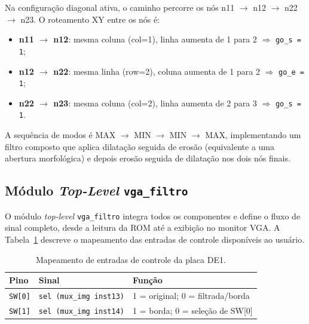 \documentclass[12pt, a4paper]{article}
\begin{document}
	Na configuração diagonal ativa, o caminho percorre os nós n11
	$\to$ n12 $\to$ n22 $\to$ n23. O roteamento XY entre os nós é:
	
	\begin{itemize}
		\item \textbf{n11 $\to$ n12}: mesma coluna (col=1), linha aumenta de 1
		para 2 $\Rightarrow$ \texttt{go\_s = 1};
		\item \textbf{n12 $\to$ n22}: mesma linha (row=2), coluna aumenta de 1
		para 2 $\Rightarrow$ \texttt{go\_e = 1};
		\item \textbf{n22 $\to$ n23}: mesma coluna (col=2), linha aumenta de 2
		para 3 $\Rightarrow$ \texttt{go\_s = 1}.
	\end{itemize}
	
	A sequência de modos é MAX $\to$ MIN $\to$ MIN $\to$ MAX, implementando um
	filtro composto que aplica dilatação seguida de erosão (equivalente a uma
	abertura morfológica) e depois erosão seguida de dilatação nos dois nós finais.
	
	\subsection{Módulo \textit{Top-Level} \texttt{vga\_filtro}}
	
	O módulo \textit{top-level} \texttt{vga\_filtro} integra todos os componentes
	e define o fluxo de sinal completo, desde a leitura da ROM até a exibição
	no monitor VGA. A Tabela~\ref{tab:controles} descreve o mapeamento das
	entradas de controle disponíveis ao usuário.
	
	\begin{table}[H]
		\centering
		\caption{Mapeamento de entradas de controle da placa DE1.}
		\label{tab:controles}
		\begin{tabular}{lll}
			\toprule
			\textbf{Pino} & \textbf{Sinal} & \textbf{Função} \\
			\midrule
			\texttt{SW[0]} & \texttt{sel (mux\_img inst13)} & 1 = original; 0 = filtrada/borda \\
			\texttt{SW[1]} & \texttt{sel (mux\_img inst14)} & 1 = borda; 0 = seleção de SW[0]  \\
			\bottomrule
		\end{tabular}
	\end{table}
	
\end{document}
